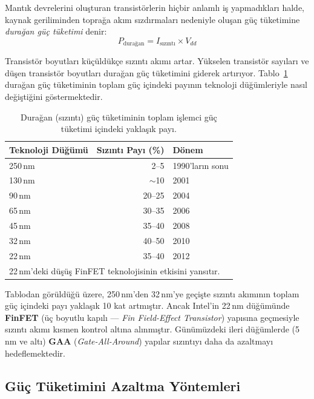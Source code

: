 Mantık devrelerini oluşturan transistörlerin hiçbir anlamlı iş yapmadıkları halde, kaynak geriliminden toprağa akım sızdırmaları nedeniyle oluşan güç tüketimine \emph{durağan güç tüketimi} denir:
\begin{equation}
P_{\text{durağan}} = I_{\text{sızıntı}} \times V_{dd}
\label{eq:duragan-guc}
\end{equation}

Transistör boyutları küçüldükçe sızıntı akımı artar. Yükselen transistör sayıları ve düşen transistör boyutları durağan güç tüketimini giderek artırıyor. Tablo~\ref{tab:sizinti-trend} durağan güç tüketiminin toplam güç içindeki payının teknoloji düğümleriyle nasıl değiştiğini göstermektedir.

\begin{table}[ht!]
\centering
\caption[Durağan güç oranının teknoloji düğümlerine göre değişimi]{Durağan (sızıntı) güç tüketiminin toplam işlemci güç tüketimi içindeki yaklaşık payı.}
\label{tab:sizinti-trend}
\footnotesize
\begin{tabular}{lrl}
\toprule
\textbf{Teknoloji Düğümü} & \textbf{Sızıntı Payı (\%)} & \textbf{Dönem} \\
\midrule
250\,nm  & 2--5    & 1990'ların sonu \\
130\,nm  & ${\sim}$10   & 2001 \\
90\,nm   & 20--25  & 2004 \\
65\,nm   & 30--35  & 2006 \\
45\,nm   & 35--40  & 2008 \\
32\,nm   & 40--50  & 2010 \\
22\,nm   & 35--40  & 2012 \\
\bottomrule
\multicolumn{3}{l}{\scriptsize 22\,nm'deki düşüş FinFET teknolojisinin etkisini yansıtır.}
\end{tabular}
\end{table}

Tablodan görüldüğü üzere, 250\,nm'den 32\,nm'ye geçişte sızıntı akımının toplam güç içindeki payı yaklaşık 10 kat artmıştır. Ancak Intel'in 22\,nm düğümünde \textbf{FinFET} (üç boyutlu kapılı --- \emph{Fin Field-Effect Transistor}) yapısına geçmesiyle sızıntı akımı kısmen kontrol altına alınmıştır. Günümüzdeki ileri düğümlerde (5\,nm ve altı) \textbf{GAA} (\emph{Gate-All-Around}) yapılar sızıntıyı daha da azaltmayı hedeflemektedir.


\subsection{Güç Tüketimini Azaltma Yöntemleri}
\label{sec:guc-azaltma}

